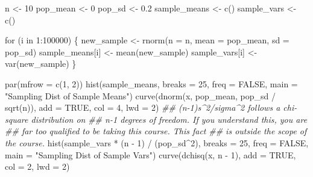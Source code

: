 \documentclass[
  letterpaper,
  DIV=11,
  numbers=noendperiod]{scrreprt}
\newenvironment{Shaded}{\begin{snugshade}}{\end{snugshade}}
\newcommand{\AttributeTok}[1]{\textcolor[rgb]{0.40,0.45,0.13}{#1}}
\newcommand{\ConstantTok}[1]{\textcolor[rgb]{0.56,0.35,0.01}{#1}}
\newcommand{\ControlFlowTok}[1]{\textcolor[rgb]{0.00,0.23,0.31}{#1}}
\newcommand{\DecValTok}[1]{\textcolor[rgb]{0.68,0.00,0.00}{#1}}
\newcommand{\DocumentationTok}[1]{\textcolor[rgb]{0.37,0.37,0.37}{\textit{#1}}}
\newcommand{\FloatTok}[1]{\textcolor[rgb]{0.68,0.00,0.00}{#1}}
\newcommand{\FunctionTok}[1]{\textcolor[rgb]{0.28,0.35,0.67}{#1}}
\newcommand{\NormalTok}[1]{\textcolor[rgb]{0.00,0.23,0.31}{#1}}
\newcommand{\OtherTok}[1]{\textcolor[rgb]{0.00,0.23,0.31}{#1}}
\newcommand{\SpecialCharTok}[1]{\textcolor[rgb]{0.37,0.37,0.37}{#1}}
\newcommand{\StringTok}[1]{\textcolor[rgb]{0.13,0.47,0.30}{#1}}
\begin{document}
\begin{Shaded}
\begin{Highlighting}[]
\NormalTok{n }\OtherTok{\textless{}{-}} \DecValTok{10}
\NormalTok{pop\_mean }\OtherTok{\textless{}{-}} \DecValTok{0}
\NormalTok{pop\_sd }\OtherTok{\textless{}{-}} \FloatTok{0.2}
\NormalTok{sample\_means }\OtherTok{\textless{}{-}} \FunctionTok{c}\NormalTok{()}
\NormalTok{sample\_vars }\OtherTok{\textless{}{-}} \FunctionTok{c}\NormalTok{()}

\ControlFlowTok{for}\NormalTok{ (i }\ControlFlowTok{in} \DecValTok{1}\SpecialCharTok{:}\DecValTok{100000}\NormalTok{) \{}
\NormalTok{    new\_sample }\OtherTok{\textless{}{-}} \FunctionTok{rnorm}\NormalTok{(}\AttributeTok{n =}\NormalTok{ n, }\AttributeTok{mean =}\NormalTok{ pop\_mean, }\AttributeTok{sd =}\NormalTok{ pop\_sd)}
\NormalTok{    sample\_means[i] }\OtherTok{\textless{}{-}} \FunctionTok{mean}\NormalTok{(new\_sample)}
\NormalTok{    sample\_vars[i] }\OtherTok{\textless{}{-}} \FunctionTok{var}\NormalTok{(new\_sample)}
\NormalTok{\}}

\FunctionTok{par}\NormalTok{(}\AttributeTok{mfrow =} \FunctionTok{c}\NormalTok{(}\DecValTok{1}\NormalTok{, }\DecValTok{2}\NormalTok{))}
\FunctionTok{hist}\NormalTok{(sample\_means, }\AttributeTok{breaks =} \DecValTok{25}\NormalTok{, }\AttributeTok{freq =} \ConstantTok{FALSE}\NormalTok{,}
    \AttributeTok{main =} \StringTok{"Sampling Dist of Sample Means"}\NormalTok{)}
\FunctionTok{curve}\NormalTok{(}\FunctionTok{dnorm}\NormalTok{(x, pop\_mean, pop\_sd }\SpecialCharTok{/} \FunctionTok{sqrt}\NormalTok{(n)), }\AttributeTok{add =} \ConstantTok{TRUE}\NormalTok{,}
    \AttributeTok{col =} \DecValTok{4}\NormalTok{, }\AttributeTok{lwd =} \DecValTok{2}\NormalTok{)}
\DocumentationTok{\#\# (n{-}1)s\^{}2/sigma\^{}2 follows a chi{-}square distribution on}
\DocumentationTok{\#\# n{-}1 degrees of freedom. If you understand this, you are}
\DocumentationTok{\#\# far too qualified to be taking this course. This fact}
\DocumentationTok{\#\# is outside the scope of the course.}
\FunctionTok{hist}\NormalTok{(sample\_vars }\SpecialCharTok{*}\NormalTok{ (n }\SpecialCharTok{{-}} \DecValTok{1}\NormalTok{) }\SpecialCharTok{/}\NormalTok{ (pop\_sd}\SpecialCharTok{\^{}}\DecValTok{2}\NormalTok{), }\AttributeTok{breaks =} \DecValTok{25}\NormalTok{, }\AttributeTok{freq =} \ConstantTok{FALSE}\NormalTok{,}
    \AttributeTok{main =} \StringTok{"Sampling Dist of Sample Vars"}\NormalTok{)}
\FunctionTok{curve}\NormalTok{(}\FunctionTok{dchisq}\NormalTok{(x, n }\SpecialCharTok{{-}} \DecValTok{1}\NormalTok{), }\AttributeTok{add =} \ConstantTok{TRUE}\NormalTok{, }\AttributeTok{col =} \DecValTok{2}\NormalTok{, }\AttributeTok{lwd =} \DecValTok{2}\NormalTok{)}
\end{Highlighting}
\end{Shaded}
\end{document}
